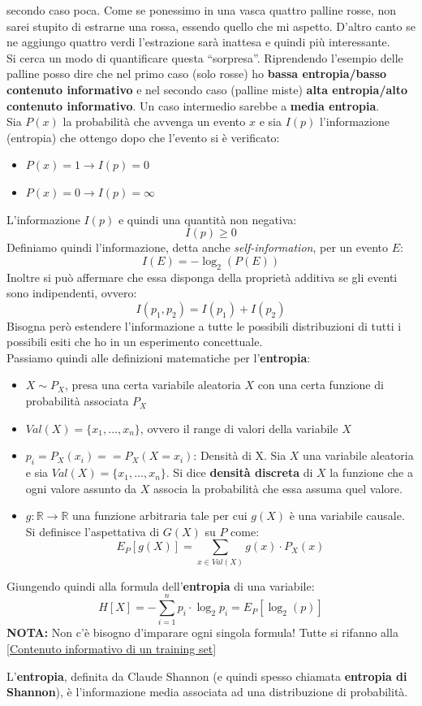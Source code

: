 secondo caso poca. Come se ponessimo in una vasca quattro palline rosse, non
sarei stupito di estrarne una rossa, essendo quello che mi aspetto. D'altro
canto se ne aggiungo quattro verdi l'estrazione sarà inattesa e quindi più
interessante.\\ 
Si cerca un modo di quantificare questa ``sorpresa''. Riprendendo l'esempio
delle palline posso dire che nel primo caso (solo rosse) ho \textbf{bassa
  entropia/basso contenuto informativo} e nel secondo caso (palline miste) \textbf{alta entropia/alto contenuto informativo}. Un caso
intermedio sarebbe a \textbf{media entropia}.\\
Sia $P(x)$ la probabilità che avvenga un evento $x$ e sia $I(p)$ l'informazione (entropia) che ottengo dopo che l'evento si è verificato:
\begin{itemize}
  \item $P(x)=1\to I(p)=0$
  \item $P(x)=0\to I(p)=\infty$
\end{itemize}
L'informazione $I(p)$ e quindi una quantità non negativa:
\[I(p)\geq 0\]
Definiamo quindi l'informazione, detta anche \textit{self-information}, per un
evento $E$: 
\[I(E)=-\log_2(P(E))\]
Inoltre si può affermare che essa disponga della proprietà additiva se gli eventi sono indipendenti, ovvero:
\[I(p_1, p_2)=I(p_1)+I(p_2)\]
Bisogna però estendere l'informazione a tutte le possibili distribuzioni di
tutti i possibili esiti che ho in un esperimento concettuale.\\
Passiamo quindi alle definizioni matematiche per l'\textbf{entropia}:
\begin{itemize}
  \item $X\sim P_X$, presa una certa variabile aleatoria $X$ con una certa funzione di probabilità associata $P_X$
  \item $Val(X)=\{x_1,\ldots, x_n\}$, ovvero il range di valori della variabile
  $X$
  \item $p_i=P_X(x_i)==P_X(X=x_i)$: Densità di X. Sia $X$ una variabile aleatoria e sia $Val(X)=\{x_1,\ldots, x_n\}$. Si dice \textbf{densità discreta} di $X$ la funzione che a ogni valore assunto da $X$ associa la probabilità che essa assuma quel valore.
  \item $g:\mathbb{R}\to\mathbb{R}$ una funzione arbitraria tale per cui $g(X)$
  è una variabile causale. Si definisce l'aspettativa di $G(X)$ su $P$ come:
  \[E_P[g(X)]=\sum_{x\in Val(X)} g(x)\cdot P_X(x)\]
\end{itemize}
Giungendo quindi alla formula dell'\textbf{entropia} di una variabile:
\begin{equation}
    H[X]=-\sum_{i=1}^n p_i\cdot\log_2 p_i=E_P[\log_2(p)]
\label{Entropia Variabile}
\end{equation}
\textbf{NOTA:} Non c'è bisogno d'imparare ogni singola formula! Tutte si rifanno alla \ref{Contenuto informativo di un training set}
\begin{definizione}
  L'\textbf{entropia}, definita da Claude Shannon (e quindi spesso chiamata
  \textbf{entropia di Shannon}), è l'informazione media associata ad
  una distribuzione di probabilità.
\end{definizione}
